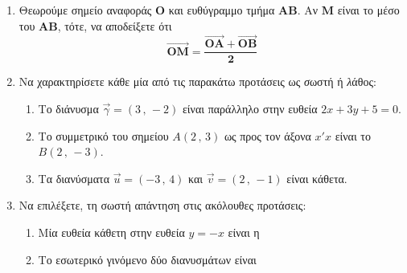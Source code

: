 \documentclass[12pt,a4page]{article}
\begin{document}
\authoritylogo[3]
\hfill%
\examdetailsii

\vspace{4ex}


\vspace*{1.0ex}

\setlength \baselineskip{14.5pt}

\begin{schltask}
\item \leavevmode%
  \begin{enumerate}[label=\bf Α\arabic*.,before=\vspace{-2ex},leftmargin=24pt]
  \item Θεωρούμε σημείο αναφοράς $\bm{O}$ και ευθύγραμμο τμήμα $\bm{AB}$. Αν $\bm{M}$ είναι το μέσο του $\bm{AB}$, τότε, να αποδείξετε ότι\phantom{.} %
    $$\bm{\overrightarrow{OM} = \frac{\overrightarrow{OA} + \overrightarrow{OB}}{2}}$$
  \item Να χαρακτηρίσετε κάθε μία από τις παρακάτω προτάσεις ως {\textit σωστή} ή {\textit λάθος}:
  \begin{enumerate}[label=\bf\roman*)]
  \item Το διάνυσμα $\vec{\gamma} = (3 \,,\, -2)$ είναι παράλληλο στην ευθεία $2x + 3y + 5 = 0$.
  \item Το συμμετρικό του σημείου $A(2 \,,\, 3)$ ως προς τον άξονα $x'x$ είναι το $B(2 \,,\, -3)$.
  \item  Τα διανύσματα $\vec{u} = (-3 \,,\, 4)$ και $\vec{v} = (2 \,,\, -1)$ είναι κάθετα.
  \end{enumerate}
\item Να επιλέξετε, τη σωστή απάντηση στις ακόλουθες προτάσεις: 
  \begin{enumerate}[label=\bf\roman*)]
  \item Μία ευθεία κάθετη στην ευθεία $y = -x$ είναι η\\
  \item Το εσωτερικό γινόμενο δύο διανυσμάτων είναι\\
    \begin{multichoice}

\end{multichoice}
\end{enumerate}
\end{enumerate}
\end{schltask}
\end{document}
